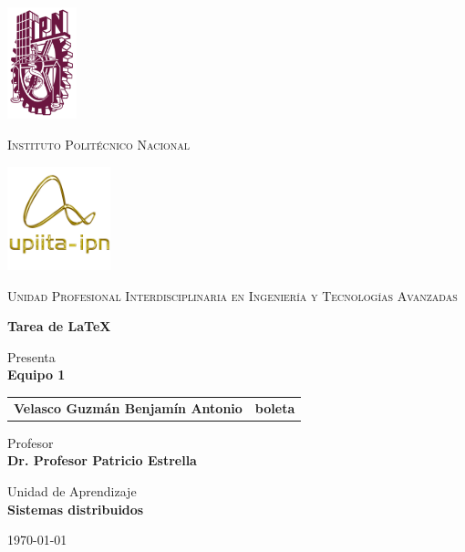 \documentclass[12pt, letterpaper]{article}
\date{\today}
\begin{document}
	\thispagestyle{empty}

	\begin{minipage}{2cm}
		\centering
		\includegraphics[width=2cm]{ipn.png}
		\label{fig-ipn-cover}
	\end{minipage}
	\hfill %
	\begin{minipage}{\linewidth-6cm}
		\centering
		\huge
		\textsc{Instituto Politécnico Nacional}
	\end{minipage}
	\hfill %
	\begin{minipage}{3cm}
		\centering
		\includegraphics[width=3cm]{upiita-oro.png}
		\label{fig-upiita-cover}
	\end{minipage}
	
	\vspace{0.5cm}
	
	\begin{center}
		\LARGE
		\textsc{Unidad Profesional Interdisciplinaria en Ingeniería y Tecnologías Avanzadas}
		
		\vspace{1.5cm}
		\Large
		\textbf{Tarea de \LaTeX}
		
		\vspace{1cm}
		\large
		Presenta\\
		\vspace{0.3cm}
		\textbf{Equipo 1}
		\vspace{0.3cm}
		\begin{table}[h]
			\centering
			\large
			\begin{tabular}{lr}
				\textbf{Velasco Guzmán Benjamín Antonio}	&	\textbf{boleta}
			\end{tabular}
		\end{table}
		
		\vspace{1cm}
		\large
		Profesor\\
		\vspace{0.3cm}
		\large
		\textbf{Dr. Profesor Patricio Estrella}
		
		\vspace{1cm}
		\large
		Unidad de Aprendizaje \\
		\vspace{0.3cm}
		\large
		\textbf{Sistemas distribuidos}
		
		\vspace{1cm}
		\today
	\end{center}
	
	\newpage
\end{document}
